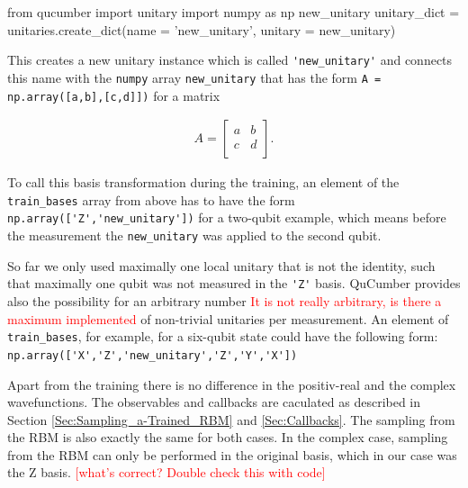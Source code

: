 \documentclass[submission, Phys]{SciPost}
\begin{document}
\begin{python}
	from qucumber import unitary
	import numpy as np
	new_unitary
	unitary_dict = unitaries.create_dict(name = 'new_unitary', unitary = new_unitary)
\end{python}
This creates a new unitary instance which is called \verb|'new_unitary'| and connects this name with the \verb|numpy| array
\verb|new_unitary| that has the form \verb|A = np.array([a,b],[c,d]])| for a matrix

\begin{align}
	A =
	\begin{bmatrix}
		a & b \\
		c & d \\
	\end{bmatrix}.
\end{align}

To call this basis transformation during the training, an element of the \verb|train_bases| array from above has to have the form
\verb|np.array(['Z','new_unitary'])| for a two-qubit example,
which means before the measurement the \verb|new_unitary| was applied to the second qubit.

So far we only used maximally one local unitary that is not the identity, such that maximally one qubit was not measured in the \verb|'Z'| basis.
QuCumber provides also the possibility for an arbitrary number \textcolor{red}{It is not really arbitrary, is there a maximum implemented} of non-trivial unitaries per measurement.
An element of \verb|train_bases|, for example, for a six-qubit state could have the following form:
\verb|np.array(['X','Z','new_unitary','Z','Y','X'])|

Apart from the training there is no difference in the positiv-real and the complex wavefunctions. The observables and callbacks are caculated as described in Section \ref{Sec:Sampling_a-Trained_RBM} and \ref{Sec:Callbacks}.
The sampling from the RBM is also exactly the same for both cases.
In the complex case, sampling from the RBM can only be performed in the original basis, which in our case was the Z basis.
\textcolor{red}{[what's correct? Double check this with code]}
%
\end{document}
